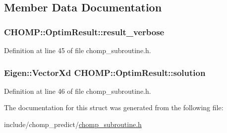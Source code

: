 \subsection{Member Data Documentation}
\subsubsection[{\texorpdfstring{result\+\_\+verbose}{result_verbose}}]{ C\+H\+O\+M\+P\+::\+Optim\+Result\+::result\+\_\+verbose}\hypertarget{struct_c_h_o_m_p_1_1_optim_result_aa4314b8ae0ca38f9bad7fd8c7e1f9492}{}\label{struct_c_h_o_m_p_1_1_optim_result_aa4314b8ae0ca38f9bad7fd8c7e1f9492}


Definition at line 45 of file chomp\+\_\+subroutine.\+h.

\subsubsection[{\texorpdfstring{solution}{solution}}]{\setlength{\rightskip}{0pt plus 5cm}Eigen\+::\+Vector\+Xd C\+H\+O\+M\+P\+::\+Optim\+Result\+::solution}\hypertarget{struct_c_h_o_m_p_1_1_optim_result_ae85f14f34c231bb2f5767553b6771f9c}{}\label{struct_c_h_o_m_p_1_1_optim_result_ae85f14f34c231bb2f5767553b6771f9c}


Definition at line 46 of file chomp\+\_\+subroutine.\+h.



The documentation for this struct was generated from the following file\+:\begin{DoxyCompactItemize}
\item 
include/chomp\+\_\+predict/\hyperlink{chomp__subroutine_8h}{chomp\+\_\+subroutine.\+h}\end{DoxyCompactItemize}
